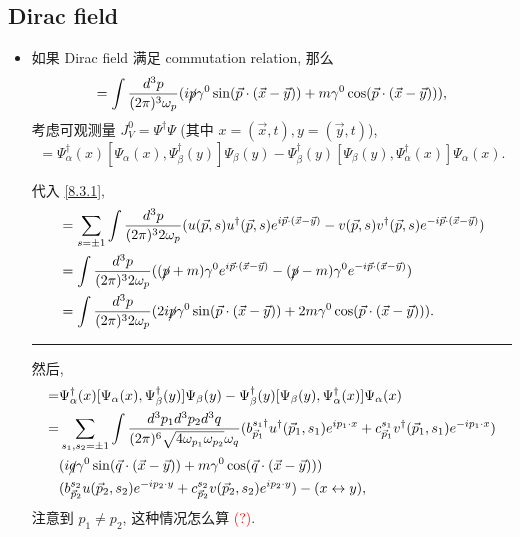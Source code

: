 \subsection{Dirac field}
\begin{itemize}
	\item 如果 Dirac field 满足 commutation relation, 那么
	\begin{equation}
		[\Psi(\vec{x}, t), \Psi^\dag(\vec{y}, t)] = \int \frac{d^3 p}{(2 \pi)^3 \omega_p} (i \cancel{p} \gamma^0 \sin(\vec{p} \cdot (\vec{x} - \vec{y})) + m \gamma^0 \cos(\vec{p} \cdot (\vec{x} - \vec{y}))),
	\end{equation}
	考虑可观测量 $J_V^0 = \Psi^\dag \Psi$ (其中 $x = (\vec{x}, t), y = (\vec{y}, t)$),
	\begin{equation}
		[J_V^0(x), J_V^0(y)] = \Psi^\dag_\alpha(x) [\Psi_\alpha(x), \Psi^\dag_\beta(y)] \Psi_\beta(y) - \Psi^\dag_\beta(y) [\Psi_\beta(y), \Psi^\dag_\alpha(x)] \Psi_\alpha(x).
	\end{equation}
	
	\begin{tcolorbox}[title=calculation:]
		代入 \eqref{8.3.1},
		\begin{align}
			[\Psi(\vec{x}, t), \Psi^\dag(\vec{y}, t)] &= \sum_{s = \pm 1} \int \frac{d^3 p}{(2 \pi)^3 2 \omega_p} (u(\vec{p}, s) u^\dag(\vec{p}, s) e^{i \vec{p} \cdot (\vec{x} - \vec{y})} - v(\vec{p}, s) v^\dag(\vec{p}, s) e^{- i \vec{p} \cdot (\vec{x} - \vec{y})}) \notag \\
			&= \int \frac{d^3 p}{(2 \pi)^3 2 \omega_p} ((\cancel{p} + m) \gamma^0 e^{i \vec{p} \cdot (\vec{x} - \vec{y})} - (\cancel{p} - m) \gamma^0 e^{- i \vec{p} \cdot (\vec{x} - \vec{y})}) \notag \\
			&= \int \frac{d^3 p}{(2 \pi)^3 2 \omega_p} (2 i \cancel{p} \gamma^0 \sin(\vec{p} \cdot (\vec{x} - \vec{y})) + 2 m \gamma^0 \cos(\vec{p} \cdot (\vec{x} - \vec{y}))).
		\end{align}
		
		\noindent\rule[0.5ex]{\linewidth}{0.5pt} %
		
		然后,
		\begin{align}
			[J_V^0(x), J_V^0(y)] =& \Psi^\dag_\alpha(x) [\Psi_\alpha(x), \Psi^\dag_\beta(y)] \Psi_\beta(y) - \Psi^\dag_\beta(y) [\Psi_\beta(y), \Psi^\dag_\alpha(x)] \Psi_\alpha(x) \notag \\
			=& \sum_{s_1, s_2 = \pm 1} \int \frac{d^3 p_1 d^3 p_2 d^3 q}{(2 \pi)^6 \sqrt{4 \omega_{p_1} \omega_{p_2}} \omega_q} (b^{s_1 \dag}_{\vec{p}_1} u^\dag(\vec{p}_1, s_1) e^{i p_1 \cdot x} + c^{s_1}_{\vec{p}_1} v^\dag(\vec{p}_1, s_1) e^{- i p_1 \cdot x}) \notag \\
			& (i \cancel{q} \gamma^0 \sin(\vec{q} \cdot (\vec{x} - \vec{y})) + m \gamma^0 \cos(\vec{q} \cdot (\vec{x} - \vec{y}))) \notag \\
			& (b^{s_2}_{\vec{p}_2} u(\vec{p}_2, s_2) e^{- i p_2 \cdot y} + c^{s_2}_{\vec{p}_2} v(\vec{p}_2, s_2) e^{i p_2 \cdot y}) - (x \leftrightarrow y),
		\end{align}
		注意到 $p_1 \neq p_2$, 这种情况怎么算 \textcolor{red}{(?)}.
	\end{tcolorbox}
\end{itemize}

